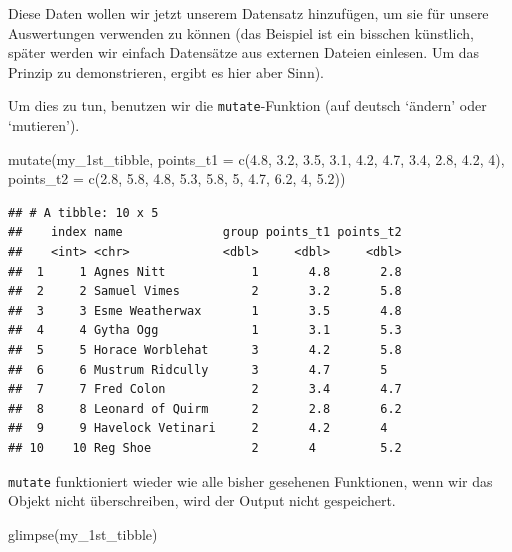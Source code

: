 \documentclass[
]{book}
\newenvironment{Shaded}{\begin{snugshade}}{\end{snugshade}}
\newcommand{\AttributeTok}[1]{\textcolor[rgb]{0.77,0.63,0.00}{#1}}
\newcommand{\DecValTok}[1]{\textcolor[rgb]{0.00,0.00,0.81}{#1}}
\newcommand{\FloatTok}[1]{\textcolor[rgb]{0.00,0.00,0.81}{#1}}
\newcommand{\FunctionTok}[1]{\textcolor[rgb]{0.00,0.00,0.00}{#1}}
\newcommand{\NormalTok}[1]{#1}
\begin{document}
Diese Daten wollen wir jetzt unserem Datensatz hinzufügen, um sie für unsere Auswertungen verwenden zu können (das Beispiel ist ein bisschen künstlich, später werden wir einfach Datensätze aus externen Dateien einlesen. Um das Prinzip zu demonstrieren, ergibt es hier aber Sinn).

Um dies zu tun, benutzen wir die \texttt{mutate}-Funktion (auf deutsch `ändern' oder `mutieren').

\begin{Shaded}
\begin{Highlighting}[]
\FunctionTok{mutate}\NormalTok{(my\_1st\_tibble, }
       \AttributeTok{points\_t1 =} \FunctionTok{c}\NormalTok{(}\FloatTok{4.8}\NormalTok{, }\FloatTok{3.2}\NormalTok{, }\FloatTok{3.5}\NormalTok{, }\FloatTok{3.1}\NormalTok{, }\FloatTok{4.2}\NormalTok{, }\FloatTok{4.7}\NormalTok{, }\FloatTok{3.4}\NormalTok{, }\FloatTok{2.8}\NormalTok{, }\FloatTok{4.2}\NormalTok{, }\DecValTok{4}\NormalTok{),}
         \AttributeTok{points\_t2 =} \FunctionTok{c}\NormalTok{(}\FloatTok{2.8}\NormalTok{, }\FloatTok{5.8}\NormalTok{, }\FloatTok{4.8}\NormalTok{, }\FloatTok{5.3}\NormalTok{, }\FloatTok{5.8}\NormalTok{, }\DecValTok{5}\NormalTok{, }\FloatTok{4.7}\NormalTok{, }\FloatTok{6.2}\NormalTok{, }\DecValTok{4}\NormalTok{, }\FloatTok{5.2}\NormalTok{))}
\end{Highlighting}
\end{Shaded}

\begin{verbatim}
## # A tibble: 10 x 5
##    index name              group points_t1 points_t2
##    <int> <chr>             <dbl>     <dbl>     <dbl>
##  1     1 Agnes Nitt            1       4.8       2.8
##  2     2 Samuel Vimes          2       3.2       5.8
##  3     3 Esme Weatherwax       1       3.5       4.8
##  4     4 Gytha Ogg             1       3.1       5.3
##  5     5 Horace Worblehat      3       4.2       5.8
##  6     6 Mustrum Ridcully      3       4.7       5  
##  7     7 Fred Colon            2       3.4       4.7
##  8     8 Leonard of Quirm      2       2.8       6.2
##  9     9 Havelock Vetinari     2       4.2       4  
## 10    10 Reg Shoe              2       4         5.2
\end{verbatim}

\texttt{mutate} funktioniert wieder wie alle bisher gesehenen Funktionen, wenn wir das Objekt nicht überschreiben, wird der Output nicht gespeichert.

\begin{Shaded}
\begin{Highlighting}[]
\FunctionTok{glimpse}\NormalTok{(my\_1st\_tibble)}
\end{Highlighting}
\end{Shaded}
\end{document}
